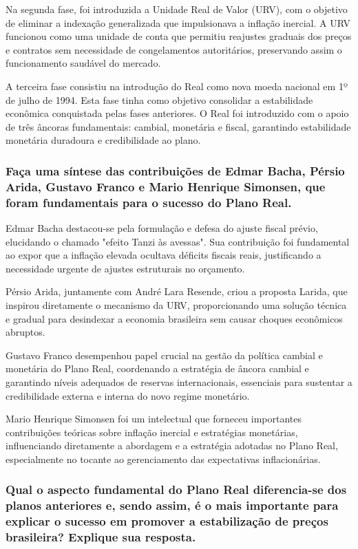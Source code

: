 \documentclass[a4paper,12pt]{article}[abntex2]
\begin{document}
Na segunda fase, foi introduzida a Unidade Real de Valor (URV), com o objetivo de eliminar a indexação generalizada que impulsionava a inflação inercial. A URV funcionou como uma unidade de conta que permitiu reajustes graduais dos preços e contratos sem necessidade de congelamentos autoritários, preservando assim o funcionamento saudável do mercado.

A terceira fase consistiu na introdução do Real como nova moeda nacional em 1º de julho de 1994. Esta fase tinha como objetivo consolidar a estabilidade econômica conquistada pelas fases anteriores. O Real foi introduzido com o apoio de três âncoras fundamentais: cambial, monetária e fiscal, garantindo estabilidade monetária duradoura e credibilidade ao plano.

\subsubsection{\textbf{Faça uma síntese das contribuições de Edmar Bacha, Pérsio Arida, Gustavo Franco e Mario Henrique Simonsen, que foram fundamentais para o sucesso do Plano Real.}}

Edmar Bacha destacou-se pela formulação e defesa do ajuste fiscal prévio, elucidando o chamado "efeito Tanzi às avessas". Sua contribuição foi fundamental ao expor que a inflação elevada ocultava déficits fiscais reais, justificando a necessidade urgente de ajustes estruturais no orçamento.

Pérsio Arida, juntamente com André Lara Resende, criou a proposta Larida, que inspirou diretamente o mecanismo da URV, proporcionando uma solução técnica e gradual para desindexar a economia brasileira sem causar choques econômicos abruptos.

Gustavo Franco desempenhou papel crucial na gestão da política cambial e monetária do Plano Real, coordenando a estratégia de âncora cambial e garantindo níveis adequados de reservas internacionais, essenciais para sustentar a credibilidade externa e interna do novo regime monetário.

Mario Henrique Simonsen foi um intelectual que forneceu importantes contribuições teóricas sobre inflação inercial e estratégias monetárias, influenciando diretamente a abordagem e a estratégia adotadas no Plano Real, especialmente no tocante ao gerenciamento das expectativas inflacionárias.

\subsubsection{\textbf{Qual o aspecto fundamental do Plano Real diferencia-se dos planos anteriores e, sendo assim, é o mais importante para explicar o sucesso em promover a estabilização de preços brasileira? Explique sua resposta.}}
\end{document}
